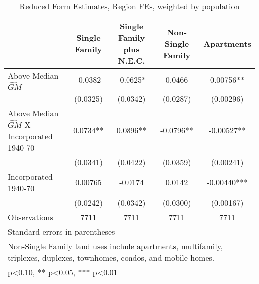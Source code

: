 \begin{table}[htbp]\centering
\def\sym#1{\ifmmode^{#1}\else\(^{#1}\)\fi}
\caption{Reduced Form Estimates, Region FEs, weighted by population}
\begin{tabular}{l*{4}{c}}
\toprule
                    &\multicolumn{1}{c}{Single Family}&\multicolumn{1}{c}{Single Family plus N.E.C.}&\multicolumn{1}{c}{Non-Single Family}&\multicolumn{1}{c}{Apartments}\\
\midrule
Above Median $\widehat{GM}$&     -0.0382   &     -0.0625*  &      0.0466   &     0.00756** \\
                    &    (0.0325)   &    (0.0342)   &    (0.0287)   &   (0.00296)   \\
\addlinespace
Above Median $\widehat{GM}$ X Incorporated 1940-70&      0.0734** &      0.0896** &     -0.0796** &    -0.00527** \\
                    &    (0.0341)   &    (0.0422)   &    (0.0359)   &   (0.00241)   \\
\addlinespace
Incorporated 1940-70&     0.00765   &     -0.0174   &      0.0142   &    -0.00440***\\
                    &    (0.0242)   &    (0.0342)   &    (0.0300)   &   (0.00167)   \\
\midrule
Observations        &        7711   &        7711   &        7711   &        7711   \\
\bottomrule
\multicolumn{5}{l}{\footnotesize Standard errors in parentheses}\\
\multicolumn{5}{l}{\footnotesize Non-Single Family land uses include apartments, multifamily, triplexes, duplexes, townhomes, condos, and mobile homes.}\\
\multicolumn{5}{l}{\footnotesize * p<0.10, ** p<0.05, *** p<0.01}\\
\end{tabular}
\end{table}
